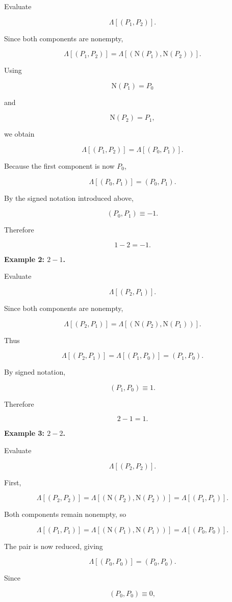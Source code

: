\documentclass[12pt]{article}
\newcommand{\Nu}{\mathrm{N}}
\begin{document}
Evaluate

\[
\Lambda[(P_1,P_2)].
\]

Since both components are nonempty,

\[
\Lambda[(P_1,P_2)]
=
\Lambda[(\Nu(P_1),\Nu(P_2))].
\]

Using

\[
\Nu(P_1)=P_0
\]

and

\[
\Nu(P_2)=P_1,
\]

we obtain

\[
\Lambda[(P_1,P_2)]
=
\Lambda[(P_0,P_1)].
\]

Because the first component is now \(P_0\),

\[
\Lambda[(P_0,P_1)]
=
(P_0,P_1).
\]

By the signed notation introduced above,

\[
(P_0,P_1)\equiv-1.
\]

Therefore

\[
\boxed{
1-2=-1.
}
\]

\textbf{Example 2: \(2-1\).}

Evaluate

\[
\Lambda[(P_2,P_1)].
\]

Since both components are nonempty,

\[
\Lambda[(P_2,P_1)]
=
\Lambda[(\Nu(P_2),\Nu(P_1))].
\]

Thus

\[
\Lambda[(P_2,P_1)]
=
\Lambda[(P_1,P_0)]
=
(P_1,P_0).
\]

By signed notation,

\[
(P_1,P_0)\equiv1.
\]

Therefore

\[
\boxed{
2-1=1.
}
\]

\textbf{Example 3: \(2-2\).}

Evaluate

\[
\Lambda[(P_2,P_2)].
\]

First,

\[
\Lambda[(P_2,P_2)]
=
\Lambda[(\Nu(P_2),\Nu(P_2))]
=
\Lambda[(P_1,P_1)].
\]

Both components remain nonempty, so

\[
\Lambda[(P_1,P_1)]
=
\Lambda[(\Nu(P_1),\Nu(P_1))]
=
\Lambda[(P_0,P_0)].
\]

The pair is now reduced, giving

\[
\Lambda[(P_0,P_0)]
=
(P_0,P_0).
\]

Since

\[
(P_0,P_0)\equiv0,
\]
\end{document}
